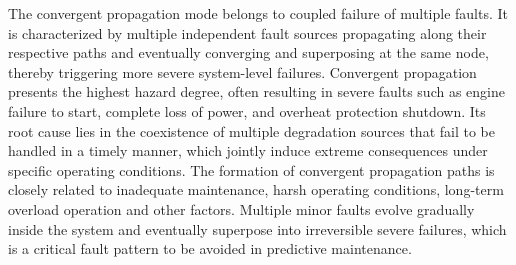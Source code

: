 \documentclass[conference]{IEEEconf}
\begin{document}
The convergent propagation mode belongs to coupled failure of multiple faults. It is characterized by multiple independent fault sources propagating along their respective paths and eventually converging and superposing at the same node, thereby triggering more severe system-level failures\cite{li2021energy}. Convergent propagation presents the highest hazard degree, often resulting in severe faults such as engine failure to start, complete loss of power, and overheat protection shutdown. Its root cause lies in the coexistence of multiple degradation sources that fail to be handled in a timely manner, which jointly induce extreme consequences under specific operating conditions. The formation of convergent propagation paths is closely related to inadequate maintenance, harsh operating conditions, long-term overload operation and other factors. Multiple minor faults evolve gradually inside the system and eventually superpose into irreversible severe failures, which is a critical fault pattern to be avoided in predictive maintenance.
\end{document}
